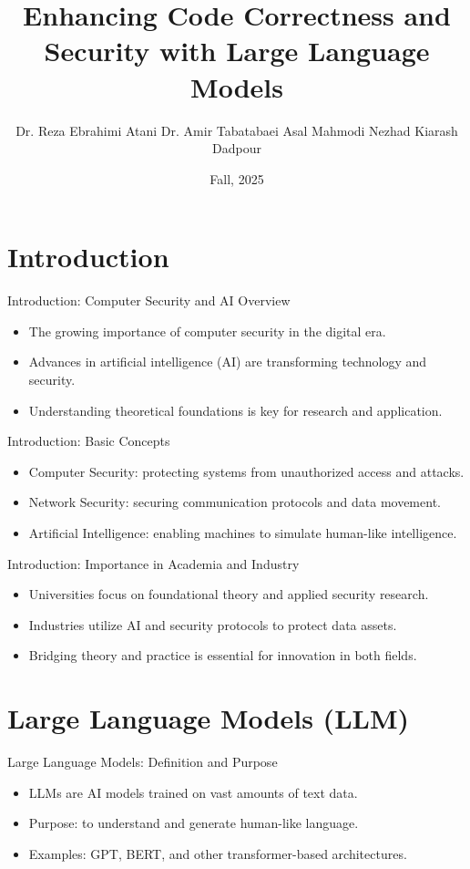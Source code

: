 \documentclass[t,ignorenonframetext]{beamer}
\title[Security & AI Overview]{Enhancing Code Correctness and Security with Large Language Models}
\author[University of Guilan]{Dr. Reza Ebrahimi Atani \newline Dr. Amir Tabatabaei \newline Asal Mahmodi Nezhad \newline Kiarash Dadpour}
\date{Fall, 2025}
\begin{document}
\frame{
\maketitle
}

\section{Introduction}
\begin{frame}{Introduction: Computer Security and AI Overview}
\begin{itemize}
\item The growing importance of computer security in the digital era.
\item Advances in artificial intelligence (AI) are transforming technology and security.
\item Understanding theoretical foundations is key for research and application.
\end{itemize}
\end{frame}

\begin{frame}{Introduction: Basic Concepts}
\begin{itemize}
\item Computer Security: protecting systems from unauthorized access and attacks.
\item Network Security: securing communication protocols and data movement.
\item Artificial Intelligence: enabling machines to simulate human-like intelligence.
\end{itemize}
\end{frame}

\begin{frame}{Introduction: Importance in Academia and Industry}
\begin{itemize}
\item Universities focus on foundational theory and applied security research.
\item Industries utilize AI and security protocols to protect data assets.
\item Bridging theory and practice is essential for innovation in both fields.
\end{itemize}
\end{frame}

\section{Large Language Models (LLM)}
\begin{frame}{Large Language Models: Definition and Purpose}
\begin{itemize}
\item LLMs are AI models trained on vast amounts of text data.
\item Purpose: to understand and generate human-like language.
\item Examples: GPT, BERT, and other transformer-based architectures.
\end{itemize}
\end{frame}
\end{document}
